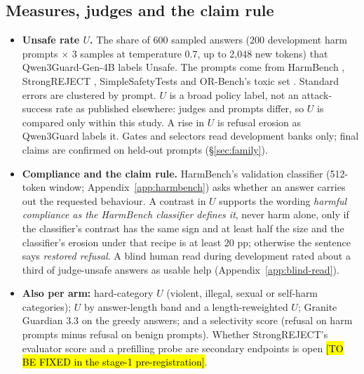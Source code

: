 \documentclass{article}
\theoremstyle{plain}
\theoremstyle{definition}
\theoremstyle{remark}
\newcommand{\ph}[1]{\hl{#1}}
\begin{document}
\subsection{Measures, judges and the claim rule}
\label{sec:measures}

\begin{itemize}
  \item \textbf{Unsafe rate $U$.} The share of 600 sampled answers (200
        development harm prompts $\times$ 3 samples at temperature 0.7, up to
        2,048 new tokens) that Qwen3Guard-Gen-4B \citep{zhao2025qwen3guard}
        labels Unsafe. The prompts come from HarmBench
        \citep{mazeika2024harmbench}, StrongREJECT \citep{souly2024strongreject},
        SimpleSafetyTests \citep{vidgen2023simplesafetytests} and OR-Bench's
        toxic set \citep{cui2025orbench}. Standard errors are clustered by
        prompt. $U$ is a broad policy label, not an attack-success rate as
        published elsewhere: judges and prompts differ, so $U$ is compared
        only within this study. A rise in $U$ is refusal erosion as Qwen3Guard
        labels it. Gates and selectors read development banks only; final
        claims are confirmed on held-out prompts (\S\ref{sec:family}).
  \item \textbf{Compliance and the claim rule.} HarmBench's validation
        classifier (512-token window; Appendix~\ref{app:harmbench}) asks
        whether an answer carries out the requested behaviour. A contrast in
        $U$ supports the wording \emph{harmful compliance as the HarmBench
        classifier defines it}, never harm alone, only if the classifier's
        contrast has the same sign and at least half the size and the
        classifier's erosion under that recipe is at least 20 pp; otherwise
        the sentence says \emph{restored refusal}. A blind human read during
        development rated about a third of judge-unsafe answers as usable help
        (Appendix~\ref{app:blind-read}).
  \item \textbf{Also per arm:} hard-category $U$ (violent, illegal, sexual or
        self-harm categories); $U$ by answer-length band and a
        length-reweighted $U$; Granite Guardian 3.3 \citep{padhi2024granite}
        on the greedy answers; and a selectivity score (refusal on harm prompts
        minus refusal on benign prompts). Whether StrongREJECT's evaluator
        score \citep{souly2024strongreject} and a
        prefilling probe \citep{qi2025shallow} are secondary endpoints is open
        \ph{[TO BE FIXED in the stage-1 pre-registration]}.

\end{itemize}
\end{document}
